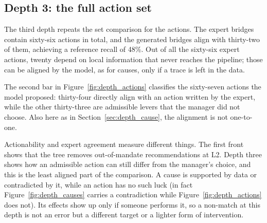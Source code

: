 \documentclass[12pt,a4paper,openright,twoside]{book}
\begin{document}
\subsection{Depth 3: the full action set}
\label{sec:depth_actions}

The third depth repeats the set comparison for the actions.
The expert bridges contain sixty-six actions in total, and the generated bridges align with thirty-two of them, achieving a reference recall of 48\%.
Out of all the sixty-six expert actions, twenty depend on local information that never reaches the pipeline; those can be aligned by the model, as for causes, only if a trace is left in the data.

The second bar in Figure~\ref{fig:depth_actions} classifies the sixty-seven actions the model proposed: thirty-four directly align with an action written by the expert, while the other thirty-three are admissible levers that the manager did not choose.
Also here as in Section~\ref{sec:depth_cause}, the alignment is not one-to-one.

Actionability and expert agreement measure different things.
The first front shows that the tree removes out-of-mandate recommendations at L2.
Depth three shows how an admissible action can still differ from the manager's choice, and this is the least aligned part of the comparison.
A cause is supported by data or contradicted by it, while an action has no such luck (in fact Figure~\ref{fig:depth_causes} carries a contradiction while Figure~\ref{fig:depth_actions} does not).
Its effects show up only if someone performs it, so a non-match at this depth is not an error but a different target or a lighter form of intervention.
\end{document}

